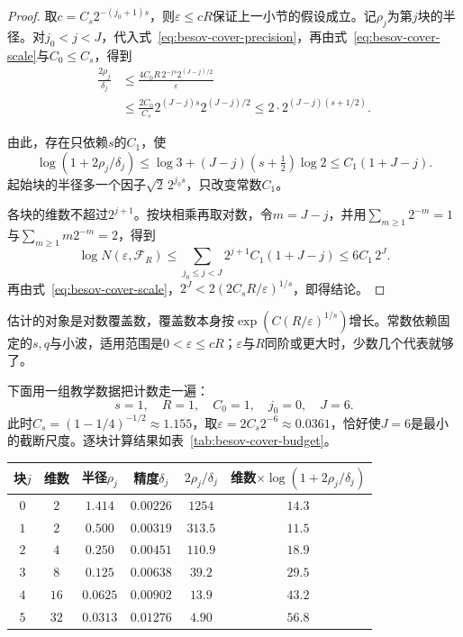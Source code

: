 \begin{proof}
取$c=C_s2^{-(j_0+1)s}$，则$\varepsilon\leq cR$保证上一小节的假设成立。记$\rho_j$为第$j$块的半径。对$j_0<j<J$，代入式~\eqref{eq:besov-cover-precision}，再由式~\eqref{eq:besov-cover-scale}与$C_0\leq C_s$，得到
\[
 \begin{aligned}
 \frac{2\rho_j}{\delta_j}&\leq\frac{4C_0R\,2^{-js}2^{(J-j)/2}}{\varepsilon}\\
 &\leq\frac{2C_0}{C_s}2^{(J-j)s}2^{(J-j)/2}\leq2\cdot2^{(J-j)(s+1/2)} .
 \end{aligned}
\]

由此，存在只依赖$s$的$C_1$，使
\[
 \log(1+2\rho_j/\delta_j)\leq\log3+(J-j)(s+\tfrac12)\log2\leq C_1(1+J-j).
\]
起始块的半径多一个因子$\sqrt2\,2^{j_0s}$，只改变常数$C_1$。

各块的维数不超过$2^{j+1}$。按块相乘再取对数，令$m=J-j$，并用$\sum_{m\geq1}2^{-m}=1$与$\sum_{m\geq1}m2^{-m}=2$，得到
\[
 \log N(\varepsilon,\mathcal F_R)\leq\sum_{j_0\leq j<J}2^{j+1}C_1(1+J-j)\leq6C_1\,2^J .
\]
再由式~\eqref{eq:besov-cover-scale}，$2^J<2(2C_sR/\varepsilon)^{1/s}$，即得结论。
\end{proof}

估计的对象是对数覆盖数，覆盖数本身按$\exp(C(R/\varepsilon)^{1/s})$增长。常数依赖固定的$s,q$与小波，适用范围是$0<\varepsilon\leq cR$；$\varepsilon$与$R$同阶或更大时，少数几个代表就够了。

下面用一组教学数据把计数走一遍：
\[
 s=1,\quad R=1,\quad C_0=1,\quad j_0=0,\quad J=6 .
\]
此时$C_s=(1-1/4)^{-1/2}\approx1.155$，取$\varepsilon=2C_s2^{-6}\approx0.0361$，恰好使$J=6$是最小的截断尺度。逐块计算结果如表~\ref{tab:besov-cover-budget}。

\begin{BookInlineTable}
  \centering
  \begin{tabular}{@{}cccccc@{}}
    \toprule
    块$j$ & 维数 & 半径$\rho_j$ & 精度$\delta_j$ & $2\rho_j/\delta_j$ & 维数$\times\log(1+2\rho_j/\delta_j)$\\
    \midrule
    $0$ & $2$ & $1.414$ & $0.00226$ & $1254$ & $14.3$\\
    $1$ & $2$ & $0.500$ & $0.00319$ & $313.5$ & $11.5$\\
    $2$ & $4$ & $0.250$ & $0.00451$ & $110.9$ & $18.9$\\
    $3$ & $8$ & $0.125$ & $0.00638$ & $39.2$ & $29.5$\\
    $4$ & $16$ & $0.0625$ & $0.00902$ & $13.9$ & $43.2$\\
    $5$ & $32$ & $0.0313$ & $0.01276$ & $4.90$ & $56.8$\\
    \bottomrule
  \end{tabular}
  \caption{覆盖计数的逐块明细（$j=0$块含粗项）。总和约为$174$，是$2^J=64$的$2.7$倍。}
  \label{tab:besov-cover-budget}
\end{BookInlineTable}

